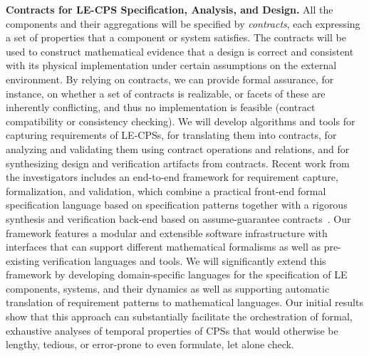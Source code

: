 \noindent \textbf{Contracts for LE-CPS Specification, Analysis, and Design.} All the components and their aggregations will be specified by \emph{contracts}, each expressing a set of properties that a component or system satisfies. The contracts will be  used to construct mathematical evidence that a design is correct and consistent with its physical implementation under certain assumptions on the external environment.
By relying on  contracts, we can provide formal assurance, for instance,  on whether a set of
contracts is realizable, or facets of these are inherently conflicting, and thus no implementation is feasible (contract compatibility or consistency checking).  
We will develop algorithms and  tools for capturing requirements of LE-CPSs, for translating them into contracts, for analyzing and validating them using contract operations and relations, and for synthesizing design and verification artifacts from contracts. Recent work from the investigators includes an end-to-end framework for requirement capture, formalization, and validation, which combine a practical front-end formal specification language based on specification patterns together with a rigorous synthesis and verification back-end based on assume-guarantee contracts~\cite{Nuzzo17}. Our framework features a modular and extensible software infrastructure with interfaces that can support different mathematical formalisms as well as pre-existing verification languages and tools. We will significantly extend this framework by developing domain-specific languages for the specification of LE components, systems, and their dynamics as well as supporting automatic translation of requirement patterns to mathematical languages.  Our initial results show that this approach can substantially facilitate the orchestration of formal, exhaustive analyses of temporal properties of CPSs that would otherwise be lengthy, tedious, or error-prone to even formulate, let alone check. 


